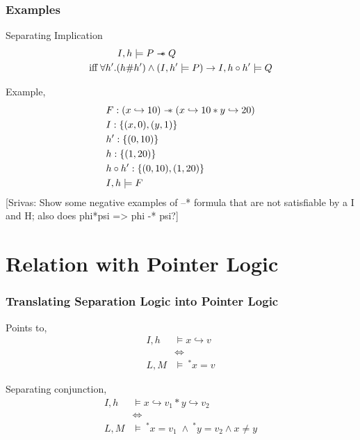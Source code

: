 \documentclass{beamer}
\newcommand\sepimp{\mathrel{-\mkern-6mu*}}
\newcommand{\mscmt}[1]{{\color{blue} [Srivas: {#1}]}}
\begin{document}
\begin{frame}
\frametitle{Examples}
Separating Implication
\begin{align*}
    I,h \models P \sepimp Q \hspace{3.5cm} \\ 
    \textrm{iff} \; \forall h'.(h \# h') \land (I,h' \models P) \to I,h \circ h' \models Q
\end{align*}

Example,
\begin{align*}
    & F : (x \hookrightarrow 10) \sepimp (x \hookrightarrow 10 * y \hookrightarrow 20) \\
    & I : \{(x,0), (y,1)\} \\
    & h' : \{(0,10)\} \\
    & h : \{(1,20) \} \\
    & h \circ h' : \{(0,10), (1,20)\} \\
    & I,h \models F
\end{align*}
\mscmt{\tiny{Show some negative examples of --* formula that are not satisfiable by a I and H; also does phi*psi => phi -* psi?}}
\end{frame}

\section{Relation with Pointer Logic}

\begin{frame}
\frametitle{Translating Separation Logic into Pointer Logic}
Points to,
\begin{align*}
    I,h & \models x \hookrightarrow v \\
    & \Longleftrightarrow \\
    L,M & \models \ ^*x = v
\end{align*}

Separating conjunction,
\begin{align*}
    I,h & \models x \hookrightarrow v_1 * y \hookrightarrow v_2 \\
    & \Longleftrightarrow \\
    L,M & \models \ ^*x = v_1 \; \land \ ^*y = v_2 \land x \neq y
\end{align*}
\end{frame}
\end{document}
